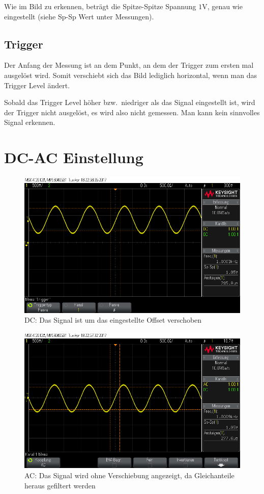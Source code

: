 \documentclass[10pt]{report}
\begin{document}
        Wie im Bild zu erkennen, beträgt die Spitze-Spitze Spannung $1$V,
        genau wie eingestellt (siehe Sp-Sp Wert unter Messungen).


       \subsection{Trigger}

        Der Anfang der Messung ist an dem Punkt, an dem der Trigger zum ersten mal
        ausgelöst wird. Somit verschiebt sich das Bild lediglich horizontal, wenn
        man das Trigger Level ändert.

         \noindent Sobald das Trigger Level höher bzw.\ niedriger als das Signal eingestellt ist,
         wird der Trigger nicht ausgelöst, es wird also nicht gemessen. Man kann kein sinnvolles
         Signal erkennen.

         \section{DC-AC Einstellung}
         \begin{figure}[H]
          \includegraphics[width=\textwidth]{scope_6.png}
          \caption{DC: Das Signal ist um das eingestellte Offset verschoben}
        \end{figure}

         \begin{figure}[H]
          \includegraphics[width=\textwidth]{scope_5.png}
          \caption{AC: Das Signal wird ohne Verschiebung angezeigt, da Gleichanteile heraus
          gefiltert werden}
        \end{figure}
\end{document}
